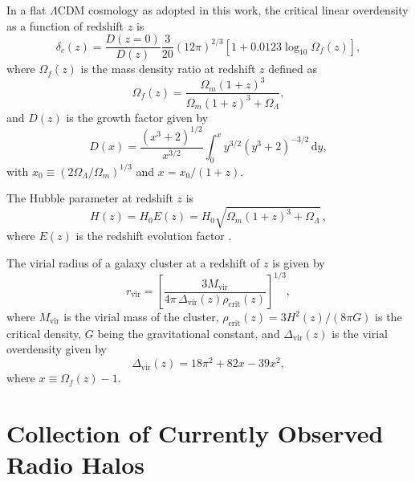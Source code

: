 \documentclass[twocolumn]{aastex62}
\newcommand{\R}[1]{\mathrm{#1}}
\newcommand{\D}[1]{\R{d} #1}
\newcommand{\lcdm}{$\Lambda$CDM}
\begin{document}
In a flat \lcdm{} cosmology as adopted in this work, the critical linear
overdensity as a function of redshift $z$ is \citep{kitayama1996,randall2002}
\begin{equation}
  \label{eq:delta-crit}
  \delta_c(z) = \frac{D(z=0)}{D(z)} \frac{3}{20} (12\pi)^{2/3}
    \left[1 + 0.0123 \log_{10} \Omega_f(z) \right],
\end{equation}
where $\Omega_f(z)$ is the mass density ratio at redshift $z$ defined as
\begin{equation}
  \label{eq:omega-fz}
  \Omega_f(z) = \frac{\Omega_m(1+z)^3}{\Omega_m(1+z)^3 + \Omega_{\Lambda}},
\end{equation}
and $D(z)$ is the growth factor given by \citep[equation~(13.6)]{peebles1980}
\begin{equation}
  \label{eq:growth-factor}
  D(x) = \frac{(x^3 + 2)^{1/2}}{x^{3/2}}
    \int_0^x y^{3/2} (y^3 + 2)^{-3/2} \,\D{y},
\end{equation}
with $x_0 \equiv (2\Omega_{\Lambda}/\Omega_m)^{1/3}$ and $x = x_0 / (1+z)$.

The Hubble parameter at redshift $z$ is
\begin{equation}
  \label{eq:hubble-z}
  H(z) = H_0 E(z) = H_0 \sqrt{\Omega_m(1+z)^3 + \Omega_{\Lambda}} \,,
\end{equation}
where $E(z)$ is the redshift evolution factor \citep{hogg1999}.

The virial radius of a galaxy cluster at a redshift of $z$ is given by
\begin{equation}
  \label{eq:radius-virial}
  r_{\R{vir}} = \left[
    \frac{3 M_{\R{vir}}}{4\pi \,\Delta_{\R{vir}}(z) \rho_{\R{crit}}(z)}
  \right]^{1/3},
\end{equation}
where $M_{\R{vir}}$ is the virial mass of the cluster,
$\rho_{\R{crit}}(z) = 3 H^2(z) / (8\pi G)$ is the critical density,
$G$ being the gravitational constant, and $\Delta_{\R{vir}}(z)$ is the
virial overdensity given by \citep[e.g.,][]{bryan1998}
\begin{equation}
  \label{eq:delta-vir}
  \Delta_{\R{vir}}(z) = 18\pi^2 + 82x - 39x^2 ,
\end{equation}
where $x \equiv \Omega_f(z) - 1$.


\section{Collection of Currently Observed Radio Halos}
\label{sec:halos-collection}
\end{document}
